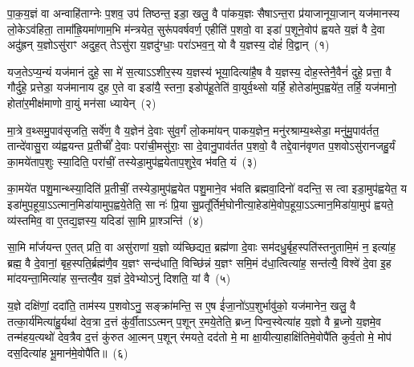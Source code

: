 {\anuvakamend[{वृ॒त्र॒हत्ये\-ऽनु॑ गाय॒त्रिणो᳚\-ऽध्व॒राणां᳚ परा॒वतो॒\-ऽस्याम॒ष्टाच॑त्वारिꣳशच्च}]}%

\setcounter{anuvakam}{0}
पा॒क॒य॒ज्ञं वा अन्वाहि॑ताग्नेः प॒शव॒ उप॑ तिष्ठन्त॒ इडा॒ खलु॒ वै पा॑कय॒ज्ञः सैषाऽन्त॒रा प्र॑याजानूया॒जान् यज॑मानस्य लो॒के\-ऽव॑हिता॒ तामा᳚ह्रि॒यमा॑णाम॒भि म॑न्त्रयेत॒ सुरू॑पवर्\mbox{}षवर्ण॒ एहीति॑ प॒शवो॒ वा इडा॑ प॒शूने॒वोप॑ ह्वयते य॒ज्ञं वै दे॒वा अदु॑ह्रन् य॒ज्ञो\-ऽसु॑राꣳ अदुह॒त् ते\-ऽसु॑रा य॒ज्ञदु॑ग्धाः॒ परा॑\-ऽभव॒न्॒ यो वै य॒ज्ञस्य॒ दोहं॑ वि॒द्वान्~(१)

यज॒ते\-ऽप्य॒न्यं यज॑मानं दुहे॒ सा मे॑ स॒त्या\-ऽ\-ऽशीर॒स्य य॒ज्ञस्य॑ भूया॒दित्या॑है॒ष वै य॒ज्ञस्य॒ दोह॒स्तेनै॒वैनं॑ दुहे॒ प्रत्ता॒ वै गौर्दु॑हे॒ प्रत्तेडा॒ यज॑मानाय दुह ए॒ते वा इडा॑यै॒ स्तना॒ इडोप॑हू॒तेति॑ वा॒युर्व॒थ्सो यर्\mbox{}हि॒ होतेडा॑मुप॒ह्वये॑त॒ तर्\mbox{}हि॒ यज॑मानो॒ होता॑र॒मीक्ष॑माणो वा॒युं मन॑सा ध्यायेन्~(२)

मा॒त्रे व॒थ्समु॒पाव॑सृजति॒ सर्वे॑ण॒ वै य॒ज्ञेन॑ दे॒वाः सु॑व॒र्गं लो॒कमा॑यन् पाकय॒ज्ञेन॒ मनु॑रश्राम्य॒थ्सेडा॒ मनु॑मु॒पाव॑र्तत॒ तान्दे॑वासु॒रा व्य॑ह्वयन्त प्र॒तीचीं᳚ दे॒वाः परा॑ची॒मसु॑राः॒ सा दे॒वानु॒पाव॑र्तत प॒शवो॒ वै तद्दे॒वान॑वृणत प॒शवो\-ऽसु॑रानजहु॒र्यं का॒मये॑ताप॒शुः स्या॒दिति॒ परा॑चीं॒ तस्येडा॒मुप॑ह्वयेताप॒शुरे॒व भ॑वति॒ यं~(३)

का॒मये॑त पशु॒मान्थ्स्या॒दिति॑ प्र॒तीचीं॒ तस्येडा॒मुप॑ह्वयेत पशु॒माने॒व भ॑वति ब्रह्मवा॒दिनो॑ वदन्ति॒ स त्वा इडा॒मुप॑ह्वयेत॒ य इडा॑मुप॒हूया॒\-ऽ\-ऽत्मान॒मिडा॑यामुप॒ह्वये॒तेति॒ सा नः॑ प्रि॒या सु॒प्रतू᳚र्तिर्म॒घोनीत्या॒हेडा॑मे॒वोप॒हूया॒\-ऽ\-ऽत्मान॒मिडा॑या॒मुप॑ ह्वयते॒ व्य॑स्तमिव॒ वा ए॒तद्य॒ज्ञस्य॒ यदिडा॑ सा॒मि प्रा॒श्ञन्ति॑~(४)

सा॒मि मा᳚र्जयन्त ए॒तत् प्रति॒ वा असु॑राणां य॒ज्ञो व्य॑च्छिद्यत॒ ब्रह्म॑णा दे॒वाः सम॑दधु॒र्बृह॒स्पति॑स्तनुतामि॒मं न॒ इत्या॑ह॒ ब्रह्म॒ वै दे॒वानां॒ बृह॒स्पति॒र्ब्रह्म॑णै॒व य॒ज्ञꣳ सन्द॑धाति॒ विच्छि॑न्नं य॒ज्ञꣳ समि॒मं द॑धा॒त्वित्या॑ह॒ सन्त॑त्यै॒ विश्वे॑ दे॒वा इ॒ह मा॑दयन्ता॒मित्या॑ह स॒न्तत्यै॒व य॒ज्ञं दे॒वेभ्यो\-ऽनु॑ दिशति॒ यां वै~(५)


य॒ज्ञे दक्षि॑णां॒ ददा॑ति॒ ताम॑स्य प॒शवो\-ऽनु॒ सङ्क्रा॑मन्ति॒ स ए॒ष ई॑जा॒नो॑\-ऽप॒शुर्भावु॑को॒ यज॑मानेन॒ खलु॒ वै तत्का॒र्य॑मित्या॑हु॒र्यथा॑ देव॒त्रा द॒त्तं कु॑र्वी॒ताऽऽत्मन् प॒शून् र॒मये॒तेति॒ ब्रध्न॒ पिन्व॒स्वेत्या॑ह य॒ज्ञो वै ब्र॒ध्नो य॒ज्ञमे॒व तन्म॑हय॒त्यथो॑ देव॒त्रैव द॒त्तं कु॑रुत आ॒त्मन् प॒शून् र॑मयते॒ दद॑तो मे॒ मा क्षा॒यीत्या॒हाक्षि॑तिमे॒वोपै॑ति कुर्व॒तो मे॒ मोप॑ दस॒दित्या॑ह भू॒मान॑मे॒वोपै॑ति॥~(६)

